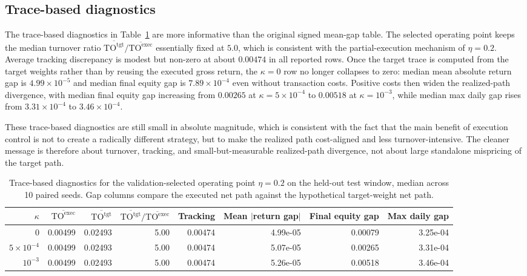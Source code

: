 \documentclass[10pt,twocolumn]{article}
\newcommand{\TOexec}{\mathrm{TO}^{\mathrm{exec}}}
\newcommand{\TOtgt}{\mathrm{TO}^{\mathrm{tgt}}}
\newcommand{\kappaTC}{\kappa}
\begin{document}
\subsection{Trace-based diagnostics}
The trace-based diagnostics in Table~\ref{tab:diagnostic_v2} are more informative than the original signed mean-gap table. The selected operating point keeps the median turnover ratio $\overline{\TOtgt}/\overline{\TOexec}$ essentially fixed at $5.0$, which is consistent with the partial-execution mechanism of $\eta=0.2$. Average tracking discrepancy is modest but non-zero at about $0.00474$ in all reported rows. Once the target trace is computed from the target weights rather than by reusing the executed gross return, the $\kappa=0$ row no longer collapses to zero: median mean absolute return gap is $4.99\times 10^{-5}$ and median final equity gap is $7.89\times 10^{-4}$ even without transaction costs. Positive costs then widen the realized-path divergence, with median final equity gap increasing from $0.00265$ at $\kappa=5\times10^{-4}$ to $0.00518$ at $\kappa=10^{-3}$, while median max daily gap rises from $3.31\times 10^{-4}$ to $3.46\times 10^{-4}$.

These trace-based diagnostics are still small in absolute magnitude, which is consistent with the fact that the main benefit of execution control is not to create a radically different strategy, but to make the realized path cost-aligned and less turnover-intensive. The cleaner message is therefore about turnover, tracking, and small-but-measurable realized-path divergence, not about large standalone mispricing of the target path.

\begin{table}[t]
\centering
\scriptsize
\caption{Trace-based diagnostics for the validation-selected operating point $\eta=0.2$ on the held-out test window, median across 10 paired seeds. Gap columns compare the executed net path against the hypothetical target-weight net path.}
\label{tab:diagnostic_v2}
\begin{tabular}{@{}rrrrrrrr@{}}
\toprule
$\kappaTC$ & $\overline{\TOexec}$ & $\overline{\TOtgt}$ & $\overline{\TOtgt}/\overline{\TOexec}$ & Tracking & Mean $|$return gap$|$ & Final equity gap & Max daily gap \\
\midrule
$0$ & 0.00499 & 0.02493 & 5.00 & 0.00474 & 4.99e-05 & 0.00079 & 3.25e-04 \\
$5\times10^{-4}$ & 0.00499 & 0.02493 & 5.00 & 0.00474 & 5.07e-05 & 0.00265 & 3.31e-04 \\
$10^{-3}$ & 0.00499 & 0.02493 & 5.00 & 0.00474 & 5.26e-05 & 0.00518 & 3.46e-04 \\
\bottomrule
\end{tabular}
\end{table}
\end{document}
